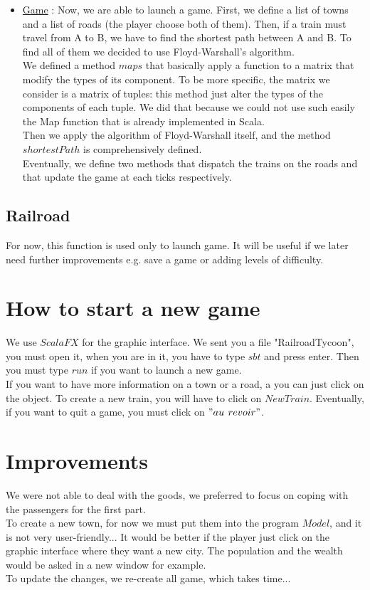 \documentclass[a4paper]{article}
\begin{document}
\begin{itemize}
		\item \underline{Game} : Now, we are able to launch a game. First, we define a list of towns and a list of roads (the player choose both of them). Then, if a train must travel from A to B, we have to find the shortest path between A and B. To find all of them we decided to use Floyd-Warshall's algorithm. \\
		We defined a method $maps$ that basically apply a function to a matrix that modify the types of its component. To be more specific, the matrix we consider is a matrix of tuples: this method just alter the types of the components of each tuple. We did that because we could not use such easily the Map function that is already implemented in Scala. \\
		Then we apply the algorithm of Floyd-Warshall itself, and the method $shortestPath$ is comprehensively defined.\\
		Eventually, we define two methods that dispatch the trains on the roads and that update the game at each ticks respectively. 
		
		
		
		
	\end{itemize}
	\subsection{Railroad}
	For now, this function is used only to launch game. It will be useful if we later need further improvements e.g. save a game or adding levels of difficulty.
	\section{How to start a new game}
	
	We use $ScalaFX$ for the graphic interface. We sent you a file "RailroadTycoon", you must open it, when you are in it, you have to type $sbt$ and press enter. Then you must type $run$ if you want to launch a new game.\\
	If you want to have more information on a town or a road, a you can just click on the object.
	To create a new train, you will have to click on $New Train$. Eventually, if you want to quit a game, you must click on $"au$ $revoir"$.
		
	\section{Improvements}
	We were not able to deal with the goods, we preferred to focus on coping with the passengers for the first part.\\
	To create a new town, for now we must put them into the program $Model$, and it is not very user-friendly... It would be better if the player just click on the graphic interface where they want a new city. The population and the wealth would be asked in a new window for example.\\
	To update the changes, we re-create all game, which takes time...
	
\end{document}
